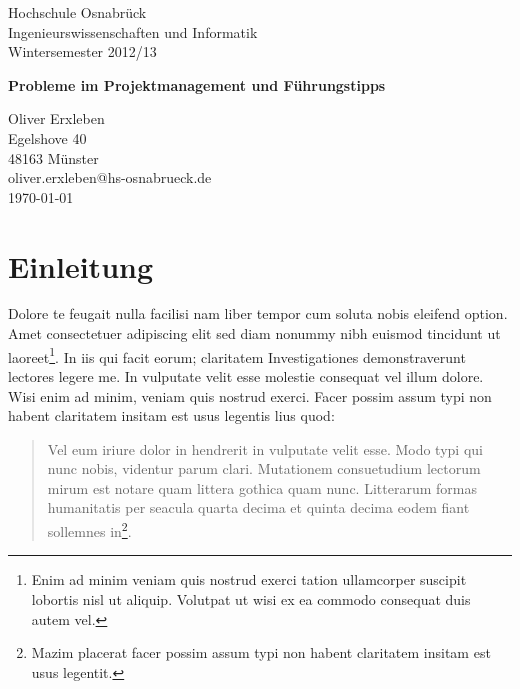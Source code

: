 \documentclass[a4paper,12pt]{scrartcl}
\begin{document}
\begin{titlepage}
\begin{small}
\vfill {Hochschule Osnabrück\\ 
Ingenieurswissenschaften und Informatik \\ 
Wintersemester 2012/13}
\end{small}


\begin{center}
\begin{Large}
\vfill {\textsf{\textbf{
Probleme im Projektmanagement und Führungstipps
}}}
\end{Large}
\end{center}

\begin{small}
\vfill Oliver Erxleben \\ Egelshove 40 \\  48163 Münster \\  oliver.erxleben@hs-osnabrueck.de\\ 
\today
\end{small}

\end{titlepage}


\tableofcontents
\thispagestyle{empty}

\clearpage

\onehalfspacing

\pagestyle{plain}


\section{Einleitung}
Dolore te feugait nulla facilisi nam liber tempor cum soluta nobis eleifend option. Amet consectetuer adipiscing elit sed diam nonummy nibh euismod tincidunt ut laoreet\footnote{Enim ad minim veniam quis nostrud exerci tation ullamcorper suscipit lobortis nisl ut aliquip. Volutpat ut wisi ex ea commodo consequat duis autem vel. }. In iis qui facit eorum; claritatem Investigationes demonstraverunt lectores legere me. In vulputate velit esse molestie consequat vel illum dolore. Wisi enim ad minim, veniam quis nostrud exerci. Facer possim assum typi non habent claritatem insitam est usus legentis lius quod:

\begin{quote}
Vel eum iriure dolor in hendrerit in vulputate velit esse. Modo typi qui nunc nobis, videntur parum clari. Mutationem consuetudium lectorum mirum est notare quam littera gothica quam nunc. Litterarum formas humanitatis per seacula quarta decima et quinta decima eodem fiant sollemnes in\footnote{Mazim placerat facer possim assum typi non habent claritatem insitam est usus legentit.}.
\end{quote}
\end{document}
